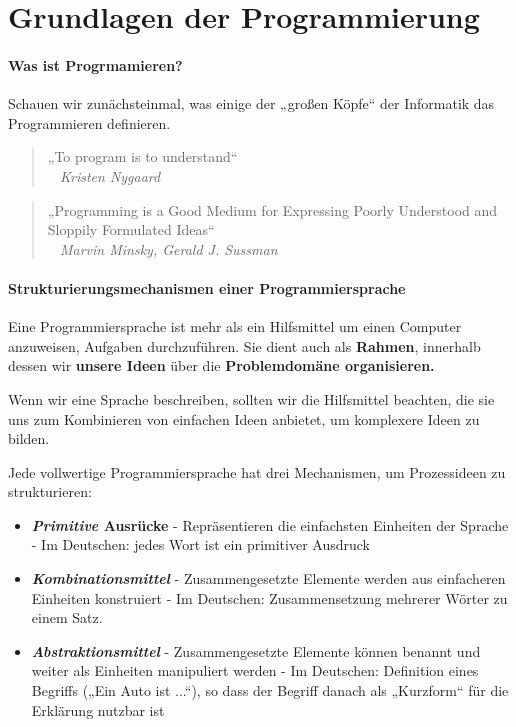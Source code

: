 
\chapter{Grundlagen der Programmierung}
\label{c:grundlagen}
\setcounter{page}{1}
\subsubsection{Was ist Progrmamieren?}

Schauen wir zunächsteinmal, was einige der „großen Köpfe“ der
Informatik das Programmieren definieren.

\begin{quote}
	„To program is to understand“ \\
	\textit{~ Kristen Nygaard}
\end{quote}

\begin{quote}
	„Programming is a Good Medium for Expressing Poorly
	Understood and Sloppily Formulated Ideas“\\
	\textit{~ Marvin Minsky, Gerald J. Sussman}
\end{quote}

\subsubsection{Strukturierungsmechanismen einer
Programmiersprache}

Eine Programmiersprache ist mehr als ein Hilfsmittel um einen
Computer anzuweisen, Aufgaben durchzuführen. 
Sie dient auch als \textbf{Rahmen}, innerhalb dessen wir \textbf{unsere
Ideen} über die \textbf{Problemdomäne organisieren.}

Wenn wir eine Sprache beschreiben, sollten wir
die Hilfsmittel beachten, die sie uns zum
Kombinieren von einfachen Ideen anbietet, um
komplexere Ideen zu bilden.

Jede vollwertige Programmiersprache hat drei Mechanismen,
um Prozessideen zu strukturieren:

\begin{itemize}
	\item \textbf{\textit{Primitive} Ausrücke}
		\subitem - Repräsentieren die einfachsten Einheiten der Sprache
		\subitem - Im Deutschen: jedes Wort ist ein primitiver Ausdruck
	\item \textbf{\textit{Kombinationsmittel}}
		\subitem - Zusammengesetzte Elemente werden aus einfacheren Einheiten
		konstruiert
		\subitem - Im Deutschen: Zusammensetzung mehrerer Wörter zu einem Satz.
	\item \textbf{\textit{Abstraktionsmittel}}
		\subitem - Zusammengesetzte Elemente können benannt und weiter als Einheiten manipuliert werden
		\subitem - Im Deutschen: Definition eines Begriffs („Ein Auto ist ...“), so dass der Begriff danach als „Kurzform“ für die Erklärung nutzbar ist
\end{itemize}

